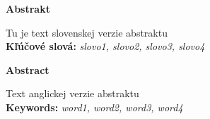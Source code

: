 {\noindent\large\bf Abstrakt}

\vspace{1.8cm}

Tu je text slovenskej verzie abstraktu
\\

{\parindent0pt \textbf{Kľúčové slová:} \emph{slovo1, slovo2, slovo3, slovo4}} 

\newpage
 {\noindent\large\bf Abstract}
  \vspace{1.8cm}
 

Text anglickej verzie abstraktu
\\

{\parindent0pt \textbf{Keywords:} \emph{word1, word2, word3, word4}}


\newpage
